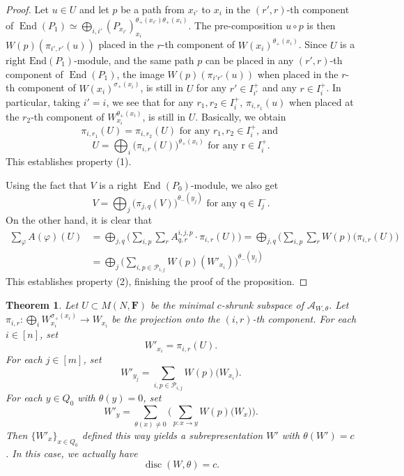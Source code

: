 \documentclass[a4paper]{amsart}
\numberwithin{equation}{section}
\theoremstyle{plain}
\newtheorem{theorem}{Theorem}[section]
\theoremstyle{definition}
\DeclareMathOperator{\Endo}{End}
\DeclareMathOperator{\disc}{disc}
\begin{document}
\begin{proof}
Let $u\in U$ and let $p$ be a path from $x_{i'}$ to $x_{i}$ in the $(r',r)$-th component of $\Endo(P_1)\simeq \bigoplus_{i,i'}(P_{x_{i'}})_{x_i}^{\theta_{+}(x_{i'})\theta_{+}(x_{i})}.$ The pre-composition $u\circ p$ is then $W(p)(\pi_{i',r'}(u))$ placed in the $r$-th component of $W(x_{i})^{\theta_{+}(x_i)}$. Since $U$ is a right $\text{End}(P_{1})$-module, and the same path $p$ can be placed in any $(r',r)$-th component of $\Endo(P_1)$, the image $W(p)(\pi_{i'r'}(u))$ when placed in the $r$-th component of $W(x_{i})^{\sigma_{+}(x_i)}$, is still in $U$ for any $r'\in I^{+}
_{i'}$ and any $r\in I^{+}_{i}$. In particular, taking $i'=i$, we see that for any $r_1,r_2\in I_{i}^{+}$, $\pi_{i,r_1}(u)$ when placed at the $r_2$-th component of $W_{x_i}^{\theta_{+}(x_i)}$, is still in $U$. Basically, we obtain $$\pi_{i,r_1}(U)=\pi_{i,r_2}(U)\text{ for any }r_1,r_2\in I_{i}^{+}\text{, and }$$ $$U=\bigoplus_{i}\big(\pi_{i,r}(U)\big)^{\theta_{+}(x_i)}\text{ for any r}\in I_{i}^{+}.$$ This establishes property (1).  

Using the fact that $V$ is a right $\Endo(P_0)$-module, we also get $$V=\bigoplus_{j}\big(\pi_{j,q}(V)\big)^{\theta_{-}(y_j)}\text{ for any q}\in I^{-}_{j}.$$  
On the other hand, it is clear that \begin{equation*}
\begin{split}
\sum_{\varphi}A(\varphi)(U)&=\bigoplus_{j,q}\big(\sum_{i,p}\sum_{r}A^{i,j,p}_{q,r}\cdot \pi_{i,r}(U)\big)=
\bigoplus_{j,q}\big(\sum_{i,p}\sum_{r}W(p)(\pi_{i,r}(U)\big)\\
&=\bigoplus_{j}\big(\sum_{i,p\in\mathcal{P}_{i,j}}W(p)(W'_{x_i})\big)^{\theta_{-}(y_j)}
\end{split}\end{equation*}
This establishes property (2), finishing the proof of the proposition.
\end{proof}

\begin{theorem}\label{from_mat_disc_to_rep_disc}
Let $U\subset M(N,\mathbf{F})$ be the minimal $c$-shrunk subspace of $\mathcal{A}_{W,\theta}$. Let $\pi_{i,r}:\bigoplus_{i}W_{x_i}^{\sigma_{+}(x_i)}\rightarrow W_{x_i}$ be the projection onto the $(i,r)$-th component. 
For each $i\in[n]$, set $$W'_{x_i}=\pi_{i,r}(U).$$ For each $j\in[m]$, set $$W'_{y_j}=\sum_{i,p\in\mathcal{P}_{i,j}}W(p)\big(W_{x_i}\big).$$ For each $y\in Q_0$ with $\theta(y)=0$, set 
$$W'_{y}=\sum_{\theta(x)\neq 0}\bigg(\sum_{p:x\rightarrow y}W(p)\big(W_{x}\big)\bigg).$$ Then $\{W'_{x}\}_{x\in Q_0}$ defined this way yields a subrepresentation $W'$ with $\theta(W')=c$. In this case,  we actually have $$\disc(W,\theta)=c.$$
\end{theorem}
\end{document}
